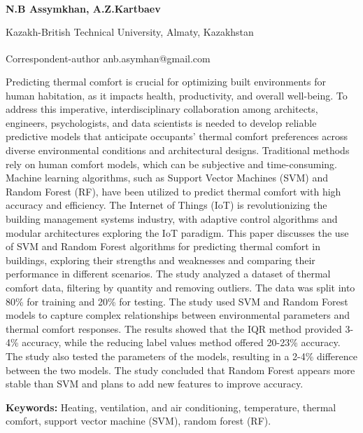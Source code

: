 
\begin{articleheader}

{\bfseries N.B Assymkhan\textsuperscript{\envelope }, A.Z.Kartbaev}
\end{articleheader}

\begin{affiliation}
Kazakh-British Technical University, Almaty, Kazakhstan

\raggedright {\bfseries \textsuperscript{\envelope }}Correspondent-author anb.asymhan@gmail.com
\end{affiliation}

Predicting thermal comfort is crucial for optimizing built environments
for human habitation, as it impacts health, productivity, and overall
well-being. To address this imperative, interdisciplinary collaboration
among architects, engineers, psychologists, and data scientists is
needed to develop reliable predictive models that anticipate occupants'
thermal comfort preferences across diverse environmental conditions and
architectural designs. Traditional methods rely on human comfort models,
which can be subjective and time-consuming. Machine learning algorithms,
such as Support Vector Machines (SVM) and Random Forest (RF), have been
utilized to predict thermal comfort with high accuracy and efficiency.
The Internet of Things (IoT) is revolutionizing the building management
systems industry, with adaptive control algorithms and modular
architectures exploring the IoT paradigm. This paper discusses the use
of SVM and Random Forest algorithms for predicting thermal comfort in
buildings, exploring their strengths and weaknesses and comparing their
performance in different scenarios. The study analyzed a dataset of
thermal comfort data, filtering by quantity and removing outliers. The
data was split into 80\% for training and 20\% for testing. The study
used SVM and Random Forest models to capture complex relationships
between environmental parameters and thermal comfort responses. The
results showed that the IQR method provided 3-4\% accuracy, while the
reducing label values method offered 20-23\% accuracy. The study also
tested the parameters of the models, resulting in a 2-4\% difference
between the two models. The study concluded that Random Forest appears
more stable than SVM and plans to add new features to improve accuracy.

{\bfseries Keywords:} Heating, ventilation, and air conditioning,
temperature, thermal comfort, support vector machine (SVM), random
forest (RF).

